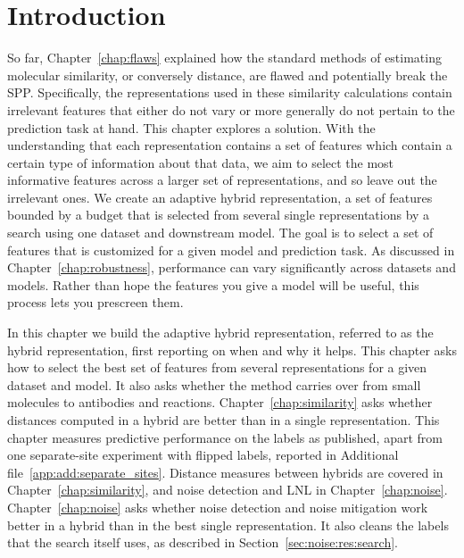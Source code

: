 \section{Introduction}

So far, Chapter~\ref{chap:flaws} explained how the standard methods of estimating molecular similarity, or conversely distance, are flawed and potentially break the SPP. Specifically, the representations used in these similarity calculations contain irrelevant features that either do not vary or more generally do not pertain to the prediction task at hand. This chapter explores a solution. With the understanding that each representation contains a set of features which contain a certain type of information about that data, we aim to select the most informative features across a larger set of representations, and so leave out the irrelevant ones. We create an adaptive hybrid representation, a set of features bounded by a budget that is selected from several single representations by a search using one dataset and downstream model. The goal is to select a set of features that is customized for a given model and prediction task. As discussed in Chapter~\ref{chap:robustness}, performance can vary significantly across datasets and models. Rather than hope the features you give a model will be useful, this process lets you prescreen them.

In this chapter we build the adaptive hybrid representation, referred to as the hybrid representation, first reporting on when and why it helps. This chapter asks how to select the best set of features from several representations for a given dataset and model. It also asks whether the method carries over from small molecules to antibodies and reactions. Chapter~\ref{chap:similarity} asks whether distances computed in a hybrid are better than in a single representation. This chapter measures predictive performance on the labels as published, apart from one separate-site experiment with flipped labels, reported in Additional file~\ref{app:add:separate_sites}. Distance measures between hybrids are covered in Chapter~\ref{chap:similarity}, and noise detection and LNL in Chapter~\ref{chap:noise}. Chapter~\ref{chap:noise} asks whether noise detection and noise mitigation work better in a hybrid than in the best single representation. It also cleans the labels that the search itself uses, as described in Section~\ref{sec:noise:res:search}.

